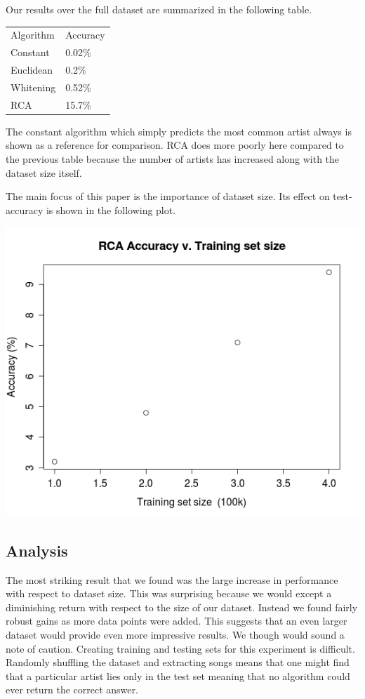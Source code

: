 \documentclass[a4paper,10pt]{article}
\begin{document}

Our results over the full dataset are summarized in the following table.

\begin{center}
\begin{tabular}{ll}
Algorithm & Accuracy \\
Constant & 0.02\% \\
Euclidean & 0.2\% \\
Whitening & 0.52\% \\
RCA & 15.7\%
\end{tabular}
\end{center}
The constant algorithm which simply predicts the most common artist always is shown as a reference for comparison. RCA does more poorly here compared to the previous table because the number of artists has increased along with the dataset size itself. 

The main focus of this paper is the importance of dataset size. Its effect on test-accuracy is shown in the following plot.
\begin{center}
 \includegraphics[scale=.4,keepaspectratio=true]{./training_set_v_accuracy.png}
\end{center}

\subsection{Analysis}
The most striking result that we found was the large increase in performance with respect to dataset size. This was surprising because we would except a diminishing return with respect to the size of our dataset. Instead we found fairly robust gains as more data points were added. This suggests that an even larger dataset would provide even more impressive results. We though would sound a note of caution. Creating training and testing sets for this experiment is difficult. Randomly shuffling the dataset and extracting songs means that one might find that a particular artist lies only in the test set meaning that no algorithm could ever return the correct answer. 
\end{document}
